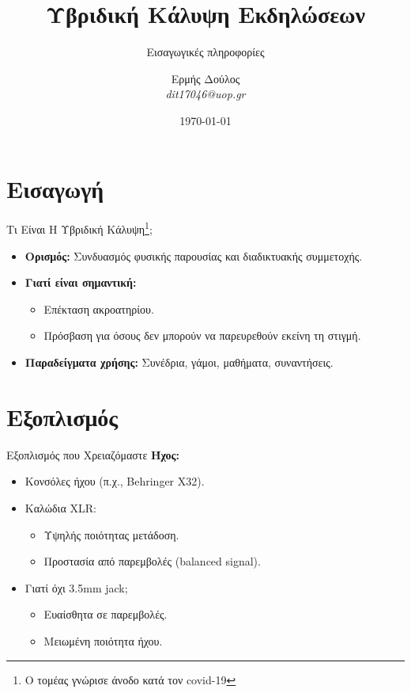\documentclass[aspectratio=169]{beamer}
\title{Υβριδική Κάλυψη Εκδηλώσεων}
\subtitle{Εισαγωγικές πληροφορίες}
\author{Ερμής Δούλος\\ \textit{dit17046@uop.gr}}
\date{\today}
\begin{document}
\frame{\titlepage}
\section{Εισαγωγή}
\begin{frame}{Τι Είναι Η Υβριδική Κάλυψη\footnote{Ο τομέας γνώρισε άνοδο κατά τον covid-19};}
  \begin{itemize}
  \item \textbf{Ορισμός:} Συνδυασμός φυσικής παρουσίας και διαδικτυακής συμμετοχής.
  \item \textbf{Γιατί είναι σημαντική:}
    \begin{itemize}
    \item Επέκταση ακροατηρίου.
    \item Πρόσβαση για όσους δεν μπορούν να παρευρεθούν εκείνη τη στιγμή.
    \end{itemize}
  \item \textbf{Παραδείγματα χρήσης:} Συνέδρια, γάμοι, μαθήματα, συναντήσεις.
  \end{itemize}
\end{frame}

\section{Εξοπλισμός}
\begin{frame}{Εξοπλισμός που Χρειαζόμαστε}
  \textbf{Ήχος:}
  \begin{itemize}
  \item Κονσόλες ήχου (π.χ., Behringer X32).
  \item Καλώδια XLR:
    \begin{itemize}
    \item Υψηλής ποιότητας μετάδοση.
    \item Προστασία από παρεμβολές (balanced signal).
    \end{itemize}
  \item Γιατί όχι 3.5mm jack;
    \begin{itemize}
    \item Ευαίσθητα σε παρεμβολές.
    \item Μειωμένη ποιότητα ήχου.
    \end{itemize}
  \end{itemize}
\end{frame}
\end{document}
